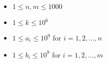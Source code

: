 \begin{itemize}
\tightlist
\item $1 \leq n, m \leq 1000$
\item $1 \leq k \leq 10^6$
\item $1 \leq a_i \leq 10^9$ for $i = 1, 2, \ldots, n$
\item $1 \leq b_i \leq 10^9$ for $i = 1, 2, \ldots, m$
\end{itemize}
